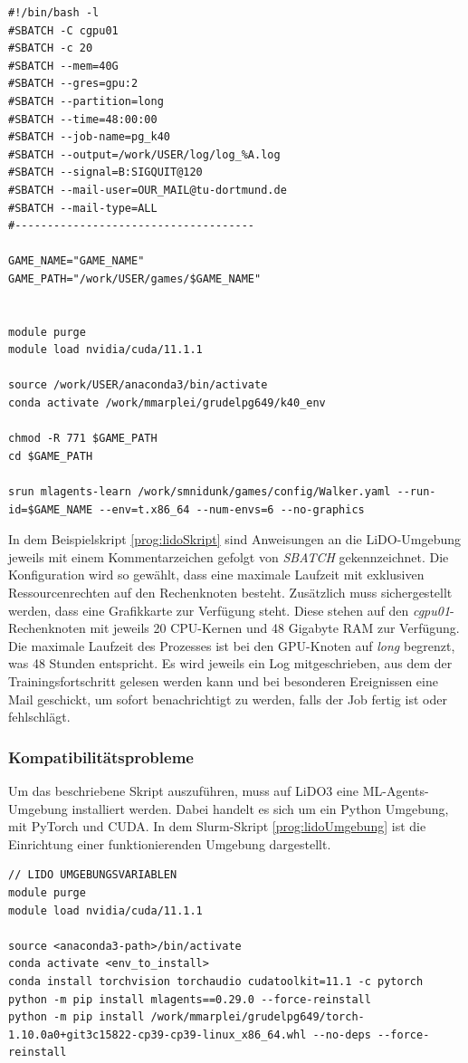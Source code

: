 \label{prog:lidoSkript}
\begin{verbatim}
#!/bin/bash -l
#SBATCH -C cgpu01
#SBATCH -c 20
#SBATCH --mem=40G
#SBATCH --gres=gpu:2
#SBATCH --partition=long
#SBATCH --time=48:00:00
#SBATCH --job-name=pg_k40
#SBATCH --output=/work/USER/log/log_%A.log
#SBATCH --signal=B:SIGQUIT@120
#SBATCH --mail-user=OUR_MAIL@tu-dortmund.de
#SBATCH --mail-type=ALL
#-------------------------------------

GAME_NAME="GAME_NAME"
GAME_PATH="/work/USER/games/$GAME_NAME"


module purge
module load nvidia/cuda/11.1.1

source /work/USER/anaconda3/bin/activate
conda activate /work/mmarplei/grudelpg649/k40_env

chmod -R 771 $GAME_PATH
cd $GAME_PATH

srun mlagents-learn /work/smnidunk/games/config/Walker.yaml --run-id=$GAME_NAME --env=t.x86_64 --num-envs=6 --no-graphics

\end{verbatim}

In dem Beispielskript \ref{prog:lidoSkript} sind Anweisungen an die LiDO-Umgebung jeweils mit einem Kommentarzeichen gefolgt von \emph{SBATCH} gekennzeichnet. Die Konfiguration wird so gewählt, dass eine maximale Laufzeit mit exklusiven Ressourcenrechten auf den Rechenknoten besteht. Zusätzlich muss sichergestellt werden, dass eine Grafikkarte zur Verfügung steht. Diese stehen auf den \emph{cgpu01}-Rechenknoten mit jeweils 20 CPU-Kernen und 48 Gigabyte RAM zur Verfügung. Die maximale Laufzeit des Prozesses ist bei den GPU-Knoten auf \emph{long} begrenzt, was 48 Stunden entspricht. Es wird jeweils ein Log mitgeschrieben, aus dem der Trainingsfortschritt gelesen werden kann und bei besonderen Ereignissen eine Mail geschickt, um sofort benachrichtigt zu werden, falls der Job fertig ist oder fehlschlägt.

\subsubsection{Kompatibilitätsprobleme}
Um das beschriebene Skript auszuführen, muss auf LiDO3 eine ML-Agents-Umgebung installiert werden. Dabei handelt es sich um ein Python Umgebung, mit PyTorch und CUDA. In dem Slurm-Skript \ref{prog:lidoUmgebung} ist die Einrichtung einer funktionierenden Umgebung dargestellt. 

\label{prog:lidoUmgebung}
\begin{verbatim}
// LIDO UMGEBUNGSVARIABLEN
module purge
module load nvidia/cuda/11.1.1

source <anaconda3-path>/bin/activate
conda activate <env_to_install>
conda install torchvision torchaudio cudatoolkit=11.1 -c pytorch
python -m pip install mlagents==0.29.0 --force-reinstall
python -m pip install /work/mmarplei/grudelpg649/torch-1.10.0a0+git3c15822-cp39-cp39-linux_x86_64.whl --no-deps --force-reinstall 
\end{verbatim}

